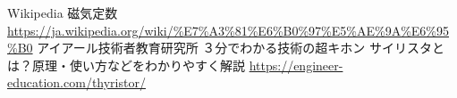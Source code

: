 
\begin{thebibliography}{99}
    \setcounter{num}{2}
    \bibitem{}Wikipedia 磁気定数 \url{https://ja.wikipedia.org/wiki/%E7%A3%81%E6%B0%97%E5%AE%9A%E6%95%B0}
    \bibitem{}アイアール技術者教育研究所 ３分でわかる技術の超キホン サイリスタとは？原理・使い方などをわかりやすく解説 \url{https://engineer-education.com/thyristor/}
\end{thebibliography}